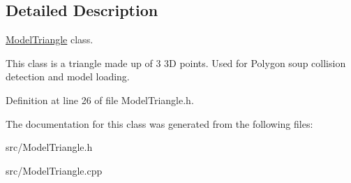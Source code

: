\subsection{Detailed Description}
\hyperlink{classModelTriangle}{Model\-Triangle} class. 

This class is a triangle made up of 3 3\-D points. Used for Polygon soup collision detection and model loading. 

Definition at line 26 of file Model\-Triangle.\-h.



The documentation for this class was generated from the following files\-:\begin{DoxyCompactItemize}
\item 
src/Model\-Triangle.\-h\item 
src/Model\-Triangle.\-cpp\end{DoxyCompactItemize}
